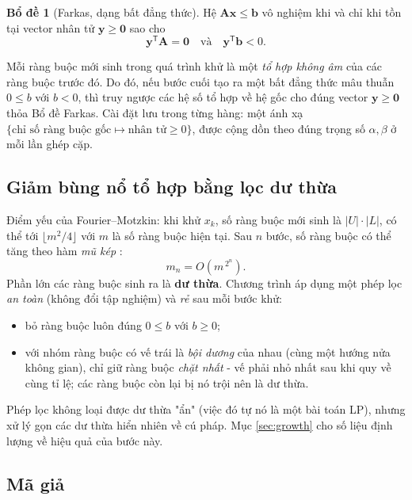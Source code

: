 \documentclass[12pt,a4paper]{article}
\theoremstyle{definition}
\newtheorem{lemma}{Bổ đề}[section]
\newcommand{\vx}{\mathbf{x}}
\newcommand{\vb}{\mathbf{b}}
\newcommand{\vy}{\mathbf{y}}
\newcommand{\mA}{\mathbf{A}}
\newcommand{\T}{^{\mathsf T}}
\begin{document}
\begin{lemma}[Farkas, dạng bất đẳng thức]
Hệ $\mA\vx \le \vb$ vô nghiệm khi và chỉ khi tồn tại vector nhân tử
$\vy \ge \mathbf{0}$ sao cho
\[
    \vy\T\mA = \mathbf{0}\quad\text{và}\quad \vy\T\vb < 0.
\]
\end{lemma}

Mỗi ràng buộc mới sinh trong quá trình khử là một \emph{tổ hợp không âm} của
các ràng buộc trước đó. Do đó, nếu bước cuối tạo ra
một bất đẳng thức mâu thuẫn $0 \le b$ với $b < 0$, thì truy ngược các hệ số tổ
hợp về hệ gốc cho đúng vector $\vy \ge \mathbf{0}$ thỏa Bổ đề Farkas. Cài
đặt lưu trong từng hàng: một ánh xạ
$\{\text{chỉ số ràng buộc gốc} \mapsto \text{nhân tử} \ge 0\}$, được cộng dồn
theo đúng trọng số $\alpha, \beta$ ở mỗi lần ghép cặp.

\subsection{Giảm bùng nổ tổ hợp bằng lọc dư thừa}
\label{sec:prune}

Điểm yếu  của Fourier--Motzkin: khi khử $x_k$, số ràng buộc mới sinh là
$|U|\cdot|L|$, có thể tới $\lfloor m^2/4\rfloor$ với $m$ là số ràng buộc hiện
tại. Sau $n$ bước, số ràng buộc có thể tăng theo hàm \emph{mũ kép}
\cite{vanderbei2014, schrijver1986}:
\begin{equation}
    m_n = O\!\left(m^{\,2^{n}}\right).
    \label{eq:blowup}
\end{equation}
Phần lớn các ràng buộc sinh ra là \textbf{dư thừa}. Chương trình áp dụng một
phép lọc \emph{an toàn} (không đổi tập nghiệm) và \emph{rẻ} sau mỗi bước khử:
\begin{itemize}
    \item bỏ ràng buộc luôn đúng $0 \le b$ với $b \ge 0$;
    \item với nhóm ràng buộc có vế trái là \emph{bội dương} của nhau (cùng một
          hướng nửa không gian), chỉ giữ ràng buộc \emph{chặt nhất} - vế phải
          nhỏ nhất sau khi quy về cùng tỉ lệ; các ràng buộc còn lại bị nó trội
          nên là dư thừa.
\end{itemize}
Phép lọc không loại được dư thừa "ẩn" (việc đó tự nó là một bài toán LP), nhưng
xử lý gọn các dư thừa hiển nhiên về cú pháp. Mục \ref{sec:growth} cho số liệu
định lượng về hiệu quả của bước này.

\subsection{Mã giả}
\end{document}
